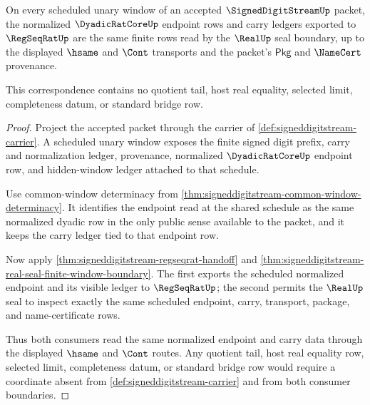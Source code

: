 \begin{theorem}
\label{thm:signeddigitstream-real-regseqrat-window-correspondence}
On every scheduled unary window of an accepted $\SignedDigitStreamUp$ packet,
the normalized $\DyadicRatCoreUp$ endpoint rows and carry ledgers exported to
$\RegSeqRatUp$ are the same finite rows read by the $\RealUp$ seal boundary,
up to the displayed $\hsame$ and $\Cont$ transports and the packet's
$\mathsf{Pkg}$ and $\NameCert$ provenance.

This correspondence contains no quotient tail, host real equality, selected
limit, completeness datum, or standard bridge row.
\end{theorem}
\begin{proof}
Project the accepted packet through the carrier of
\autoref{def:signeddigitstream-carrier}. A scheduled unary window exposes the
finite signed digit prefix, carry and normalization ledger, provenance,
normalized $\DyadicRatCoreUp$ endpoint row, and hidden-window ledger attached to
that schedule.

Use common-window determinacy from
\autoref{thm:signeddigitstream-common-window-determinacy}. It identifies the
endpoint read at the shared schedule as the same normalized dyadic row in the
only public sense available to the packet, and it keeps the carry ledger tied
to that endpoint row.

Now apply \autoref{thm:signeddigitstream-regseqrat-handoff} and
\autoref{thm:signeddigitstream-real-seal-finite-window-boundary}. The first
exports the scheduled normalized endpoint and its visible ledger to
$\RegSeqRatUp$; the second permits the $\RealUp$ seal to inspect exactly the
same scheduled endpoint, carry, transport, package, and name-certificate rows.

Thus both consumers read the same normalized endpoint and carry data through
the displayed $\hsame$ and $\Cont$ routes. Any quotient tail, host real equality
row, selected limit, completeness datum, or standard bridge row would require a
coordinate absent from \autoref{def:signeddigitstream-carrier} and from both
consumer boundaries.
\end{proof}

